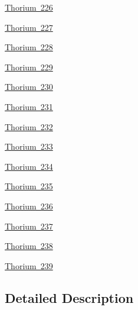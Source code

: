 \begin{DoxyCompactItemize}
\item 
\mbox{\hyperlink{group___isotope_const-_thorium-_th226}{Thorium 226}}
\item 
\mbox{\hyperlink{group___isotope_const-_thorium-_th227}{Thorium 227}}
\item 
\mbox{\hyperlink{group___isotope_const-_thorium-_th228}{Thorium 228}}
\item 
\mbox{\hyperlink{group___isotope_const-_thorium-_th229}{Thorium 229}}
\item 
\mbox{\hyperlink{group___isotope_const-_thorium-_th230}{Thorium 230}}
\item 
\mbox{\hyperlink{group___isotope_const-_thorium-_th231}{Thorium 231}}
\item 
\mbox{\hyperlink{group___isotope_const-_thorium-_th232}{Thorium 232}}
\item 
\mbox{\hyperlink{group___isotope_const-_thorium-_th233}{Thorium 233}}
\item 
\mbox{\hyperlink{group___isotope_const-_thorium-_th234}{Thorium 234}}
\item 
\mbox{\hyperlink{group___isotope_const-_thorium-_th235}{Thorium 235}}
\item 
\mbox{\hyperlink{group___isotope_const-_thorium-_th236}{Thorium 236}}
\item 
\mbox{\hyperlink{group___isotope_const-_thorium-_th237}{Thorium 237}}
\item 
\mbox{\hyperlink{group___isotope_const-_thorium-_th238}{Thorium 238}}
\item 
\mbox{\hyperlink{group___isotope_const-_thorium-_th239}{Thorium 239}}
\end{DoxyCompactItemize}


\subsection{Detailed Description}
